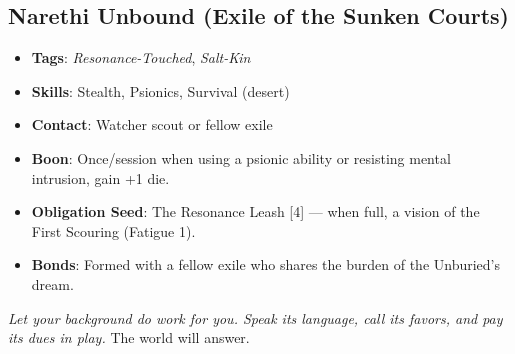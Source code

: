 \subsection*{Narethi Unbound (Exile of the Sunken Courts)}
\begin{itemize}
\item \textbf{Tags}: \textit{Resonance-Touched}, \textit{Salt-Kin}
\item \textbf{Skills}: Stealth, Psionics, Survival (desert)
\item \textbf{Contact}: Watcher scout or fellow exile
\item \textbf{Boon}: Once/session when using a psionic ability or resisting mental intrusion, gain +1 die.
\item \textbf{Obligation Seed}: The Resonance Leash [4] --- when full, a vision of the First Scouring (Fatigue 1).
\item \textbf{Bonds}: Formed with a fellow exile who shares the burden of the Unburied's dream.
\end{itemize}

\bigskip
\noindent\emph{Let your background do work for you. Speak its language, call its favors, and pay its dues in play.} The world will answer.